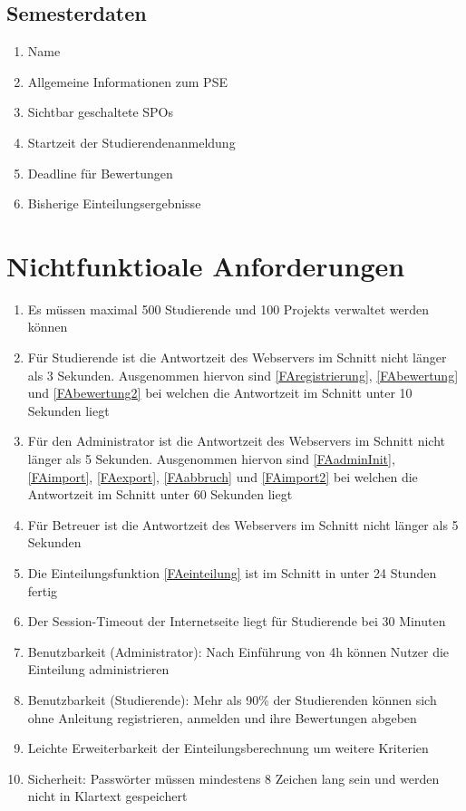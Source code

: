 \documentclass[parskip=full]{scrartcl}
\newcommand{\swtLabel}[1]{\textbf{/#1\arabic*0/}}
\begin{document}
\subsection{Semesterdaten}
\begin{enumerate}[label=\swtLabel{D}, resume]
    \item Name
    \item Allgemeine Informationen zum \gls{PSE}
    \item Sichtbar geschaltete \glspl{SPO}
    \item Startzeit der Studierendenanmeldung
    \item Deadline für Bewertungen
    \item Bisherige Einteilungsergebnisse
\end{enumerate}

\section{Nichtfunktioale Anforderungen}

\begin{enumerate}[label=\swtLabel{NF}]
  \item Es müssen maximal 500 Studierende und 100 \glspl{Projekt} verwaltet werden
  können
  \item Für Studierende ist die Antwortzeit des Webservers im Schnitt nicht
  länger als 3 Sekunden. Ausgenommen hiervon sind \ref{FAregistrierung}, 
  \ref{FAbewertung} und \ref{FAbewertung2} bei welchen die Antwortzeit im
  Schnitt unter 10 Sekunden liegt
  \item Für den Administrator ist die Antwortzeit des Webservers im Schnitt nicht
  länger als 5 Sekunden. Ausgenommen hiervon sind \ref{FAadminInit}, \ref{FAimport},
  \ref{FAexport}, \ref{FAabbruch} und \ref{FAimport2} bei welchen die Antwortzeit im Schnitt
  unter 60 Sekunden liegt
  \item Für Betreuer ist die Antwortzeit des Webservers im Schnitt nicht
  länger als 5 Sekunden
  \item Die Einteilungsfunktion \ref{FAeinteilung} ist im Schnitt in unter 24
  Stunden fertig
	\item Der Session-Timeout der Internetseite liegt für Studierende bei 30
	Minuten
	\item Benutzbarkeit (Administrator): Nach Einführung von 4h können Nutzer die
	Einteilung administrieren
	\item Benutzbarkeit (Studierende): Mehr als 90\% der Studierenden können
	sich ohne Anleitung registrieren, anmelden und ihre Bewertungen abgeben

	\item Leichte Erweiterbarkeit der Einteilungsberechnung um weitere Kriterien
	\item Sicherheit: Passwörter müssen mindestens 8 Zeichen lang sein und werden
	nicht in Klartext gespeichert
 

\end{enumerate}
\end{document}
